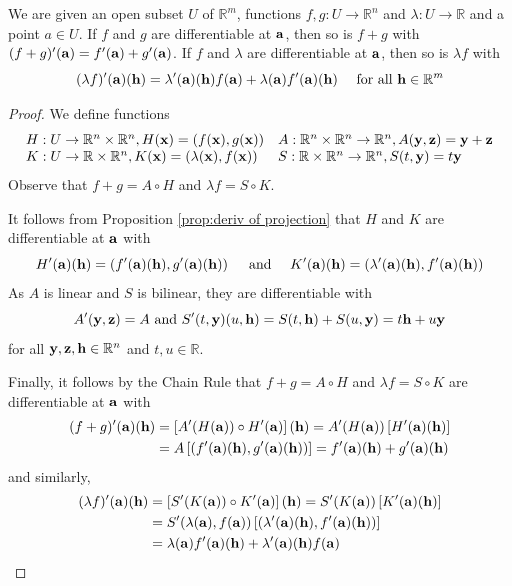 \documentclass[a4paper,11pt]{article}
\begin{document}
\begin{corollary}
    We are given an open subset $U$ of $\mathbb{R}^{m}$, functions $f, g: U \rightarrow \mathbb{R}^{n}$ and $\lambda: U \rightarrow \mathbb{R}$ and a point $a \in U$. If $f$ and $g$ are differentiable at ${\bf a}$, then so is $f+g$ with $(f+g)^{\prime}({\bf a})=f^{\prime}({\bf a})+g^{\prime}({\bf a})$. If $f$ and $\lambda$ are differentiable at ${\bf a}$, then so is $\lambda f$ with
$$
(\lambda f)^{\prime}({\bf a})({\bf h})=\lambda^{\prime}({\bf a})({\bf h}) f({\bf a})+\lambda({\bf a}) f^{\prime}({\bf a})({\bf h}) \quad \text { for all } {\bf h} \in \mathbb{R}^{m}
$$
\end{corollary}
\begin{proof}
    We define functions
$$
\begin{array}{ll}
H: U \rightarrow \mathbb{R}^{n} \times \mathbb{R}^{n}, H({\bf x})=(f({\bf x}), g({\bf x})) & A: \mathbb{R}^{n} \times \mathbb{R}^{n} \rightarrow \mathbb{R}^{n}, A({\bf y}, {\bf z})={\bf y}+{\bf z} \\
K: U \rightarrow \mathbb{R} \times \mathbb{R}^{n}, K({\bf x})=(\lambda({\bf x}), f({\bf x})) & S: \mathbb{R} \times \mathbb{R}^{n} \rightarrow \mathbb{R}^{n}, S(t, {\bf y})=t {\bf y}
\end{array}
$$
Observe that $f+g=A \circ H$ and $\lambda f=S \circ K$.

It follows from Proposition \ref{prop:deriv of projection} that $H$ and $K$ are differentiable at ${\bf a}$ with
$$
H^{\prime}({\bf a})({\bf h})=\left(f^{\prime}({\bf a})({\bf h}), g^{\prime}({\bf a})({\bf h})\right) \quad \text { and } \quad K^{\prime}({\bf a})({\bf h})=\left(\lambda^{\prime}({\bf a})({\bf h}), f^{\prime}({\bf a})({\bf h})\right)
$$
As $A$ is linear and $S$ is bilinear, they are differentiable with
$$
A^{\prime}({\bf y}, {\bf z})=A \text { and } S^{\prime}(t, {\bf y})(u, {\bf h})=S(t, {\bf h})+S(u, {\bf y})=t {\bf h}+u {\bf y}
$$
for all ${\bf y}, {\bf z}, {\bf h} \in \mathbb{R}^{n}$ and $t, u \in \mathbb{R}$.

Finally, it follows by the Chain Rule that $f+g=A \circ H$ and $\lambda f=S \circ K$ are differentiable at ${\bf a}$ with
$$
\begin{aligned}
(f+g)^{\prime}({\bf a})({\bf h}) &=\left[A^{\prime}(H({\bf a})) \circ H^{\prime}({\bf a})\right]({\bf h})=A^{\prime}(H({\bf a}))\left[H^{\prime}({\bf a})({\bf h})\right] \\
&=A\left[\left(f^{\prime}({\bf a})({\bf h}), g^{\prime}({\bf a})({\bf h})\right)\right]=f^{\prime}({\bf a})({\bf h})+g^{\prime}({\bf a})({\bf h})
\end{aligned}
$$
and similarly,
\begin{align*}
(\lambda f)^{\prime}({\bf a})({\bf h}) &=\left[S^{\prime}(K({\bf a})) \circ K^{\prime}({\bf a})\right]({\bf h})=S^{\prime}(K({\bf a}))\left[K^{\prime}({\bf a})({\bf h})\right] \\
&=S^{\prime}(\lambda({\bf a}), f({\bf a}))\left[\left(\lambda^{\prime}({\bf a})({\bf h}), f^{\prime}({\bf a})({\bf h})\right)\right] \\
&=\lambda({\bf a}) f^{\prime}({\bf a})({\bf h})+\lambda^{\prime}({\bf a})({\bf h}) f({\bf a})\qedhere
\end{align*}
\end{proof}
\end{document}
